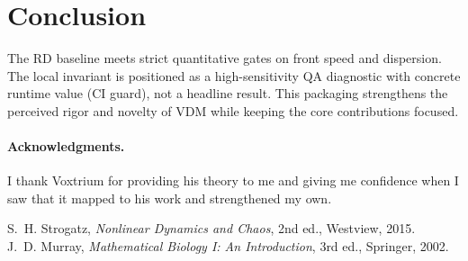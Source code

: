 \documentclass[11pt]{article}
\begin{document}
\section{Conclusion}
The RD baseline meets strict quantitative gates on front speed and dispersion. The local invariant is positioned as a high-sensitivity QA diagnostic with concrete runtime value (CI guard), not a headline result. This packaging strengthens the perceived rigor and novelty of VDM while keeping the core contributions focused.

\paragraph{Acknowledgments.}
I thank Voxtrium for providing his theory to me and giving me confidence when I saw that it mapped to his work and strengthened my own.

\begin{thebibliography}{9}
S.~H. Strogatz, \emph{Nonlinear Dynamics and Chaos}, 2nd ed., Westview, 2015.\\
J.~D. Murray, \emph{Mathematical Biology I: An Introduction}, 3rd ed., Springer, 2002.
\end{thebibliography}
\end{document}

